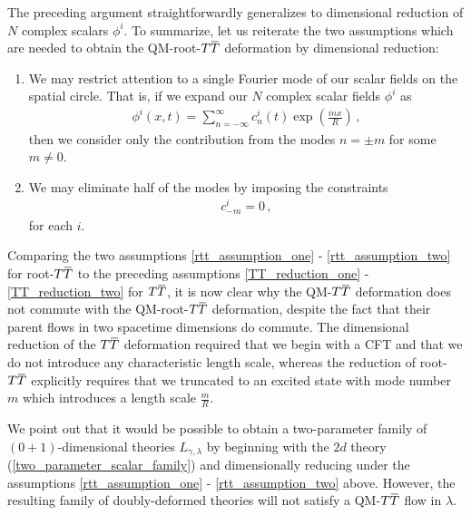 \documentclass[12pt]{article}
\numberwithin{equation}{section}
\newcommand{\overbar}[1]{\mkern 1.5mu\overline{\mkern-1.5mu#1\mkern-1.5mu}\mkern 1.5mu}
\def\TT{{T\overbar{T}}}
\begin{document}
The preceding argument straightforwardly generalizes to dimensional reduction of $N$ complex scalars $\phi^i$. To summarize, let us reiterate the two assumptions which are needed to obtain the QM-root-$\TT$ deformation by dimensional reduction:

\begin{enumerate}[label = ($\widetilde{\mathrm{\Roman*}}$)]

    \item\label{rtt_assumption_one} We may restrict attention to a single Fourier mode of our scalar fields on the spatial circle. That is, if we expand our $N$ complex scalar fields $\phi^i$ as
    \begin{align}
        \phi^i ( x, t ) = \sum_{n = - \infty}^{\infty} c^i_n ( t ) \exp \left( \frac{i n x}{R} \right) \, ,
    \end{align}
    then we consider only the contribution from the modes $n = \pm m$ for some $m \neq 0$.

    \item\label{rtt_assumption_two} We may eliminate half of the modes by imposing the constraints
    \begin{align}\label{half_dof_constraint_later}
        c_{-m}^i = 0 \, ,
    \end{align}
    for each $i$.
\end{enumerate}
%
Comparing the two assumptions \ref{rtt_assumption_one} - \ref{rtt_assumption_two} for root-$\TT$ to the preceding assumptions \ref{TT_reduction_one} - \ref{TT_reduction_two} for $\TT$, it is now clear why the QM-$\TT$ deformation does not commute with the QM-root-$\TT$ deformation, despite the fact that their parent flows in two spacetime dimensions do commute. The dimensional reduction of the $\TT$ deformation required that we begin with a CFT and that we do not introduce any characteristic length scale, whereas the reduction of root-$\TT$ explicitly requires that we truncated to an excited state with mode number $m$ which introduces a length scale $\frac{m}{R}$. 

We point out that it would be possible to obtain a two-parameter family of $(0+1)$-dimensional theories $L_{\gamma, \lambda}$ by beginning with the $2d$ theory (\ref{two_parameter_scalar_family}) and dimensionally reducing under the assumptions \ref{rtt_assumption_one} - \ref{rtt_assumption_two} above. However, the resulting family of doubly-deformed theories will not satisfy a QM-$\TT$ flow in $\lambda$.
\end{document}
